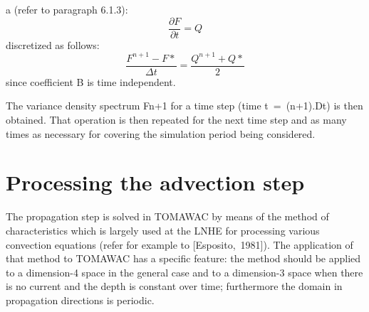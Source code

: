   a \textbf{} (refer to paragraph 6.1.3):
\begin{equation} \label{GrindEQ__6_5_}
\frac{\partial F}{\partial t} =Q
\end{equation}
discretized as follows:
\begin{equation} \label{GrindEQ__6_6_}
\frac{F^{n+1} -F*}{\Delta t} =\frac{Q^{n+1} +Q*}{2}
\end{equation}
since coefficient B is time independent.

 The variance density spectrum Fn+1 for a time step (time t~=~(n+1).Dt) is then obtained. That operation is then repeated for the next time step and as many times as necessary for covering the simulation period being considered.


\section{ Processing the advection step}

 The propagation step is solved in TOMAWAC by means of the method of characteristics which is largely used at the LNHE for processing various convection equations (refer for example to [Esposito,~1981]). The application of that method to TOMAWAC has a specific feature: the method should be applied to a dimension-4 space in the general case and to a dimension-3 space when there is no current and the depth is constant over time; furthermore the domain in propagation directions is periodic.


